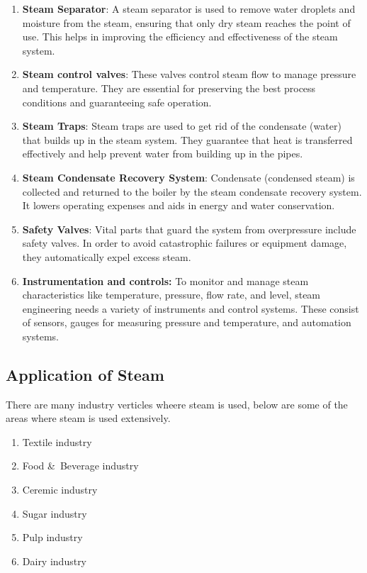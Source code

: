 \begin{enumerate}
    \item \textbf{Steam Separator}: A steam separator is used to remove water droplets and moisture from the steam, ensuring that only dry steam reaches the point of use. This helps in improving the efficiency and effectiveness of the steam system.
    \item \textbf{Steam control valves}: These valves control steam flow to manage pressure and temperature. They are essential for preserving the best process conditions and guaranteeing safe operation. 
    \item \textbf{Steam Traps}: Steam traps are used to get rid of the condensate (water) that builds up in the steam system. They guarantee that heat is transferred effectively and help prevent water from building up in the pipes. 
    \item \textbf{Steam Condensate Recovery System}: Condensate (condensed steam) is collected and returned to the boiler by the steam condensate recovery system. It lowers operating expenses and aids in energy and water conservation. 
    \item \textbf{Safety Valves}: Vital parts that guard the system from overpressure include safety valves. In order to avoid catastrophic failures or equipment damage, they automatically expel excess steam.
    \item \textbf{Instrumentation and controls:} To monitor and manage steam characteristics like temperature, pressure, flow rate, and level, steam engineering needs a variety of instruments and control systems. These consist of sensors, gauges for measuring pressure and temperature, and automation systems. 
\end{enumerate} 


\subsection{Application of Steam}
There are many industry verticles wheere steam is used, below are some of the areas where steam is used extensively.
\begin{enumerate}
    \item Textile industry
    \item Food \&\ Beverage industry
    \item Ceremic industry
    \item Sugar industry
    \item Pulp industry
    \item Dairy industry
\end{enumerate}